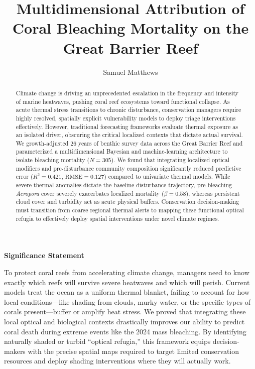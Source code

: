 \documentclass[
  letterpaper,
  DIV=11,
  numbers=noendperiod]{scrartcl}
\title{Multidimensional Attribution of Coral Bleaching Mortality on the
Great Barrier Reef}
\author{Samuel Matthews}
\date{}
\begin{document}
\maketitle
\begin{abstract}
Climate change is driving an unprecedented escalation in the frequency
and intensity of marine heatwaves, pushing coral reef ecosystems toward
functional collapse. As acute thermal stress transitions to chronic
disturbance, conservation managers require highly resolved, spatially
explicit vulnerability models to deploy triage interventions
effectively. However, traditional forecasting frameworks evaluate
thermal exposure as an isolated driver, obscuring the critical localized
contexts that dictate actual survival. We growth-adjusted 26 years of
benthic survey data across the Great Barrier Reef and parameterized a
multidimensional Bayesian and machine-learning architecture to isolate
bleaching mortality (\(N=305\)). We found that integrating localized
optical modifiers and pre-disturbance community composition
significantly reduced predictive error (\(R^2 = 0.421\),
\(\text{RMSE} = 0.127\)) compared to univariate thermal models. While
severe thermal anomalies dictate the baseline disturbance trajectory,
pre-bleaching \emph{Acropora} cover severely exacerbates localized
mortality (\(\beta = 0.58\)), whereas persistent cloud cover and
turbidity act as acute physical buffers. Conservation decision-making
must transition from coarse regional thermal alerts to mapping these
functional optical refugia to effectively deploy spatial interventions
under novel climate regimes.
\end{abstract}


\textbf{Significance Statement}

To protect coral reefs from accelerating climate change, managers need
to know exactly which reefs will survive severe heatwaves and which will
perish. Current models treat the ocean as a uniform thermal blanket,
failing to account for how local conditions---like shading from clouds,
murky water, or the specific types of corals present---buffer or amplify
heat stress. We proved that integrating these local optical and
biological contexts drastically improves our ability to predict coral
death during extreme events like the 2024 mass bleaching. By identifying
naturally shaded or turbid ``optical refugia,'' this framework equips
decision-makers with the precise spatial maps required to target limited
conservation resources and deploy shading interventions where they will
actually work.
\end{document}

